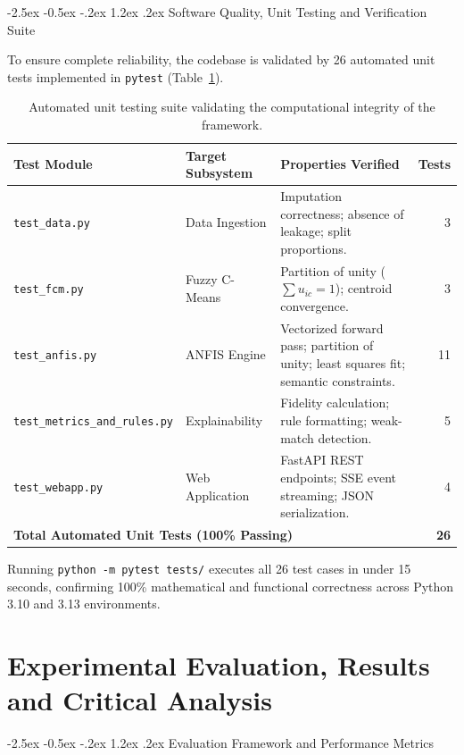 \documentclass[12pt,a4paper,oneside]{report}
\makeatletter
\renewcommand\section{\@startsection {section}{1}{\z@}%
                                   {-2.5ex \@plus -0.5ex \@minus -.2ex}%
                                   {1.2ex \@plus .2ex}%
                                   {\normalfont\fontsize{13}{16}\selectfont\bfseries}}
\makeatother
\begin{document}
\section{Software Quality, Unit Testing and Verification Suite}

To ensure complete reliability, the codebase is validated by 26 automated unit tests implemented in \texttt{pytest} (Table~\ref{tab:unit_tests}).

\begin{table}[htbp]
\centering
\footnotesize
\renewcommand{\arraystretch}{0.80}
\begin{tabularx}{\textwidth}{l l X r}
\toprule
\textbf{Test Module} & \textbf{Target Subsystem} & \textbf{Properties Verified} & \textbf{Tests} \\
\midrule
\texttt{test\_data.py} & Data Ingestion & Imputation correctness; absence of leakage; split proportions. & 3 \\
\texttt{test\_fcm.py} & Fuzzy C-Means & Partition of unity ($\sum u_{ic}=1$); centroid convergence. & 3 \\
\texttt{test\_anfis.py} & ANFIS Engine & Vectorized forward pass; partition of unity; least squares fit; semantic constraints. & 11 \\
\texttt{test\_metrics\_and\_rules.py} & Explainability & Fidelity calculation; rule formatting; weak-match detection. & 5 \\
\texttt{test\_webapp.py} & Web Application & FastAPI REST endpoints; SSE event streaming; JSON serialization. & 4 \\
\midrule
\multicolumn{3}{l}{\textbf{Total Automated Unit Tests (100\% Passing)}} & \textbf{26} \\
\bottomrule
\end{tabularx}
\caption[Automated Unit Testing Suite Verification]{Automated unit testing suite validating the computational integrity of the framework.}
\label{tab:unit_tests}
\end{table}

Running \texttt{python -m pytest tests/} executes all 26 test cases in under 15 seconds, confirming 100\% mathematical and functional correctness across Python 3.10 and 3.13 environments.


\chapter{Experimental Evaluation, Results and Critical Analysis}

\section{Evaluation Framework and Performance Metrics}
\end{document}
